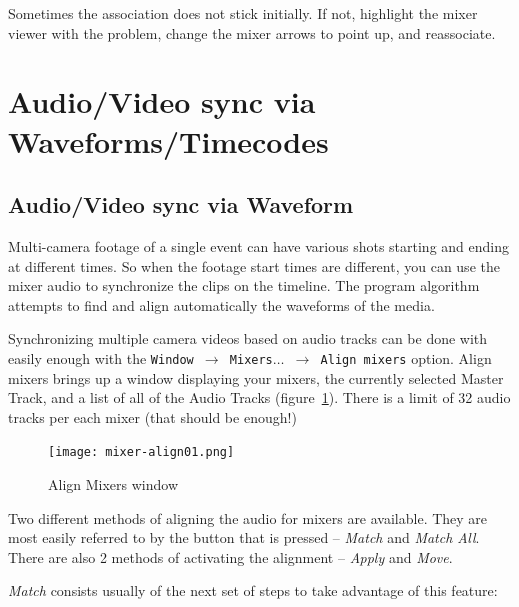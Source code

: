 Sometimes the association does not stick initially.  If not, highlight the mixer viewer with the problem, change the mixer arrows to point up, and reassociate.

\section{Audio/Video sync via Waveforms/Timecodes}%
\label{sec:audio_video_sync}

\subsection{Audio/Video sync via Waveform}%
\label{sub:audio_video_sync_waveform}

Multi-camera footage of a single event can have various shots starting and ending at different times. So when the footage start times are different, you can use the mixer audio to synchronize the clips on the timeline. The program algorithm attempts to find and align automatically the waveforms of the media.

Synchronizing multiple camera videos based on audio tracks can be done with \CGG{} easily enough with the \texttt{Window $\rightarrow$ Mixers$\dots$ $\rightarrow$  Align mixers} option.  Align mixers brings up a window displaying your mixers, the currently selected Master Track, and a list of all of the Audio Tracks (figure~\ref{fig:mixer-align01}).  There is a limit of 32 audio tracks per each mixer (that should be enough!)

\begin{figure}[htpb]
	\centering
	\texttt{[image: mixer-align01.png]}
	\caption{Align Mixers window}
	\label{fig:mixer-align01}
\end{figure}

Two different methods of aligning the audio for mixers are available. They are most easily referred to by the button that is pressed -- \textit{Match} and \textit{Match All}. There are also 2 methods of activating the alignment -- \textit{Apply} and \textit{Move}.  

\textit{Match} consists usually of the next set of steps to take advantage of this feature:

